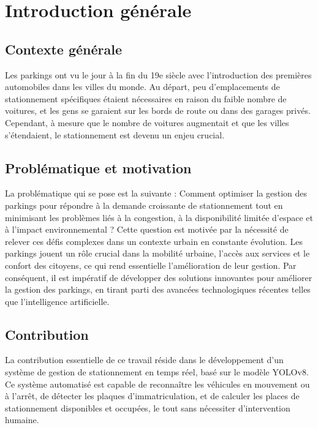\chapter*{Introduction générale}
\thispagestyle{plain}

\section*{Contexte générale}

Les parkings ont vu le jour à la fin du 19e siècle avec l'introduction des premières automobiles dans les villes du monde. Au départ, peu d'emplacements de stationnement spécifiques étaient nécessaires en raison du faible nombre de voitures, et les gens se garaient sur les bords de route ou dans des garages privés. Cependant, à mesure que le nombre de voitures augmentait et que les villes s'étendaient, le stationnement est devenu un enjeu crucial.

\section*{Problématique et motivation}

La problématique qui se pose est la suivante : Comment optimiser la gestion des parkings pour répondre à la demande croissante de stationnement tout en minimisant les problèmes liés à la congestion, à la disponibilité limitée d'espace et à l'impact environnemental ? Cette question est motivée par la nécessité de relever ces défis complexes dans un contexte urbain en constante évolution. Les parkings jouent un rôle crucial dans la mobilité urbaine, l'accès aux services et le confort des citoyens, ce qui rend essentielle l'amélioration de leur gestion. Par conséquent, il est impératif de développer des solutions innovantes pour améliorer la gestion des parkings, en tirant parti des avancées technologiques récentes telles que l'intelligence artificielle.

\section*{Contribution}

La contribution essentielle de ce travail réside dans le développement d'un système de gestion de stationnement en temps réel, basé sur le modèle YOLOv8. Ce système automatisé est capable de reconnaître les véhicules en mouvement ou à l'arrêt, de détecter les plaques d'immatriculation, et de calculer les places de stationnement disponibles et occupées, le tout sans nécessiter d'intervention humaine.

